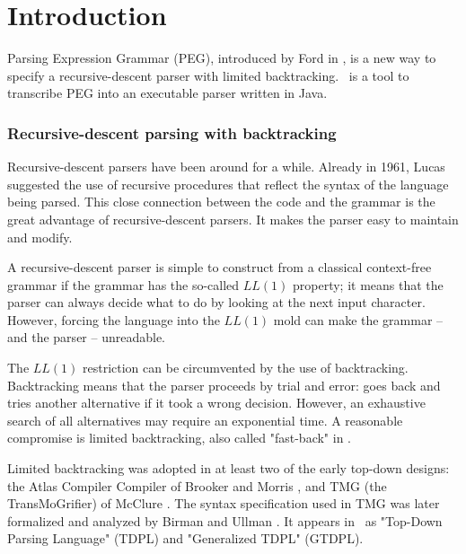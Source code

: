 
\section{Introduction}


Parsing Expression Grammar (PEG),
introduced by Ford in \cite{Ford:2004},
is a new way to specify a recursive-descent parser with limited backtracking.
\Mouse\ is a tool to transcribe PEG into an executable parser written in Java.
 

\subsubsection*{Recursive-descent parsing with backtracking}

Recursive-descent parsers have been around for a while.
Already in 1961, Lucas \cite{Lucas:1961} suggested the use of recursive procedures
that reflect the syntax of the language being parsed.
This close connection between the code and the grammar
is the great advantage of recursive-descent parsers.
It makes the parser easy to maintain and modify.

A recursive-descent parser is simple to construct
from a classical context-free grammar
if the grammar has the so-called $LL(1)$ property;
it means that the parser can always decide what to do
by looking at the next input character.
However, forcing the language into the $LL(1)$ mold 
can make the grammar -- and the parser -- unreadable.

The $LL(1)$ restriction can be circumvented by the use of backtracking.
Backtracking means that the parser proceeds by trial and error:
goes back and tries another alternative if it took a wrong decision.
However, an exhaustive search
of all alternatives may require an exponential time.
A reasonable compromise is limited backtracking, 
also called "fast-back" in \cite{Hopgood:1969}.

Limited backtracking was adopted in at least two of the early top-down designs:
the Atlas Compiler Compiler 
of Brooker and Morris \cite{Brooker:Morris:1962,Rosen:1964},  
and TMG (the TransMoGrifier) of McClure \cite{McClure:1965}.
The syntax specification used in TMG was later formalized and analyzed
by Birman and Ullman \cite{Birman:1970,Birman:Ullman:1973}.
It appears in~\cite{Aho:Ullman:1972} as "Top-Down Parsing Language" (TDPL)
and "Generalized TDPL" (GTDPL).

